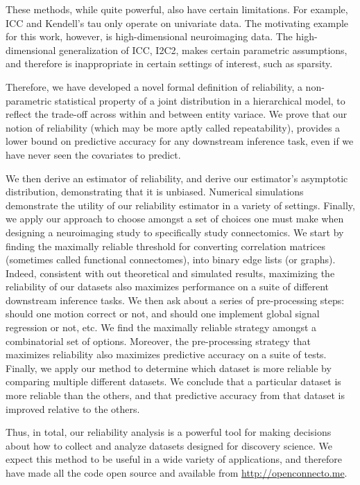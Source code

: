 \documentclass{article}
\begin{document}
These methods, while quite powerful, also have certain limitations.  For example, ICC and Kendell's tau only operate on univariate data.  The motivating example for this work, however, is high-dimensional neuroimaging data.  The high-dimensional generalization of ICC, I2C2, makes certain parametric assumptions, and therefore is inappropriate in certain settings of interest, such as sparsity.  

Therefore, we have developed a novel formal definition of reliability, 
a non-parametric statistical property of a joint distribution in a hierarchical model, 
to reflect the trade-off across within and between entity variace.  
We prove that our notion of reliability (which may be more aptly called repeatability), provides a lower bound on predictive accuracy for any downstream inference task, even if we have never seen the covariates to predict.

We then derive an estimator of reliability, and derive our estimator's asymptotic distribution, demonstrating that it is unbiased. 
Numerical simulations demonstrate the utility of our reliability estimator in a variety of settings.  Finally, we apply our approach to choose amongst a set of choices one must make when designing a neuroimaging study to specifically study connectomics.  We start by finding the maximally reliable threshold for converting correlation matrices (sometimes called functional connectomes), into binary edge lists (or graphs).  Indeed, consistent with out theoretical and simulated results, maximizing the reliability of our datasets also maximizes performance on a suite of different downstream inference tasks.  We then ask about a series of pre-processing steps: should one motion correct or not, and should one implement global signal regression or not, etc. We find the maximally reliable strategy amongst a combinatorial set of options.  Moreover, the pre-processing strategy that maximizes reliability also maximizes predictive accuracy on a suite of tests.  Finally, we apply our method to determine which dataset is more reliable by comparing multiple different datasets.  We conclude that a particular dataset is more reliable than the others, and that predictive accuracy from that dataset is improved relative to the others. 

Thus, in total, our reliability analysis is a powerful tool for making decisions about how to collect and analyze datasets designed for discovery science.  We expect this method to be useful in a wide variety of applications, and therefore have made all the code open source and available from \url{http://openconnecto.me}.
\end{document}
